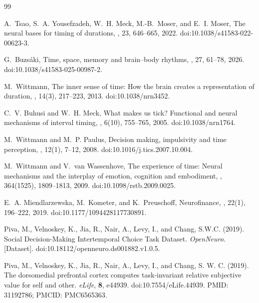 \documentclass[graybox,natbib]{SNmult}
\providecommand{\1}{}
\renewcommand{\1}{\mathbbm 1}
\begin{document}
\begin{thebibliography}{99}

A.~Tsao, S.~A. Yousefzadeh, W.~H. Meck, M.-B.~Moser, and E.~I. Moser,
\newblock The neural bases for timing of durations,
,
23, 646--665, 2022.
\newblock doi:10.1038/s41583-022-00623-3.

G.~Buzsáki,
\newblock Time, space, memory and brain--body rhythms,
,
27, 61--78, 2026.
\newblock doi:10.1038/s41583-025-00987-2.

M.~Wittmann,
\newblock The inner sense of time: How the brain creates a representation
of duration,
,
14(3), 217--223, 2013.
\newblock doi:10.1038/nrn3452.

C.~V. Buhusi and W.~H. Meck,
\newblock What makes us tick? Functional and neural mechanisms of interval
timing,
,
6(10), 755--765, 2005.
\newblock doi:10.1038/nrn1764.

M.~Wittmann and M.~P. Paulus,
\newblock Decision making, impulsivity and time perception,
,
12(1), 7--12, 2008.
\newblock doi:10.1016/j.tics.2007.10.004.

M.~Wittmann and V.~van Wassenhove,
\newblock The experience of time: Neural mechanisms and the interplay of
emotion, cognition and embodiment,
,
364(1525), 1809--1813, 2009.
\newblock doi:10.1098/rstb.2009.0025.

E.~A. Miendlarzewska, M.~Kometer, and K.~Preuschoff,
\newblock Neurofinance,
,
22(1), 196--222, 2019.
\newblock doi:10.1177/1094428117730891.

Piva, M., Velnoskey, K., Jia, R., Nair, A., Levy, I., and Chang, S.W.C.
(2019).
Social Decision-Making Intertemporal Choice Task Dataset.
\textit{OpenNeuro}. [Dataset].
doi:10.18112/openneuro.ds001882.v1.0.5.

Piva, M., Velnoskey, K., Jia, R., Nair, A., Levy, I., and Chang, S. W. C.
(2019).
The dorsomedial prefrontal cortex computes task-invariant relative subjective
value for self and other.
\textit{eLife}, \textbf{8}, e44939.
doi:10.7554/eLife.44939.
PMID: 31192786; PMCID: PMC6565363.



\end{thebibliography}
\end{document}

